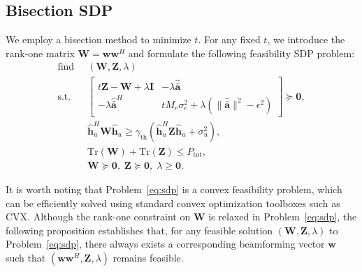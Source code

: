 \documentclass[journal]{IEEEtran}
\begin{document}
\subsection{Bisection SDP}
We employ a bisection method to minimize $t$. For any fixed $t$, we introduce the rank-one matrix $\mathbf{W} = \mathbf{w}\mathbf{w}^H$ and formulate the following feasibility SDP problem:
\begin{subequations}\label{eq:sdp}
\begin{align}
\text{find}\;\;& (\mathbf{W},\mathbf{Z},\lambda) \nonumber\\
\mathrm{s.t.}\;\;& \begin{bmatrix}
t\mathbf{Z}-\mathbf{W}+\lambda\mathbf{I} & -\lambda\hat{\bar{\mathbf{a}}}\\
-\lambda\hat{\bar{\mathbf{a}}}^H & tM_e\sigma_e^2+\lambda(\|\hat{\bar{\mathbf{a}}}\|^2-\epsilon^2)
\end{bmatrix} \succeq \mathbf{0}, \label{eq:sdp_lmi}\\
& \hat{\mathbf{h}}_u^H\mathbf{W}\hat{\mathbf{h}}_u \geq \gamma_{\mathrm{th}}\!\left(\hat{\mathbf{h}}_u^H\mathbf{Z}\hat{\mathbf{h}}_u+\sigma_u^2\right), \label{eq:sdp_qos}\\
& \mathrm{Tr}(\mathbf{W})+\mathrm{Tr}(\mathbf{Z})\leq P_{\mathrm{tot}},\label{eq:sdp_psd}\\
& \mathbf{W}\succeq \mathbf{0},\;\mathbf{Z}\succeq \mathbf{0},\;\lambda\geq \mathbf{0}.
\end{align}
\end{subequations}

It is worth noting that Problem~\eqref{eq:sdp} is a convex feasibility problem, which can be efficiently solved using standard convex optimization toolboxes such as CVX. Although the rank-one constraint on $\mathbf{W}$ is relaxed in Problem~\eqref{eq:sdp}, the following proposition establishes that, for any feasible solution $(\mathbf{W},\mathbf{Z},\lambda)$ to Problem~\eqref{eq:sdp}, there always exists a corresponding beamforming vector $\mathbf{w}$ such that $(\mathbf{w}\mathbf{w}^H,\mathbf{Z},\lambda)$ remains feasible.
\end{document}

